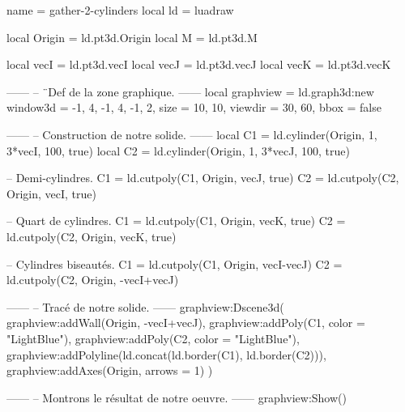 \documentclass{standalone}
\begin{document}
\begin{luadraw*}{name = gather-2-cylinders}
local ld = luadraw

local Origin = ld.pt3d.Origin
local M      = ld.pt3d.M

local vecI = ld.pt3d.vecI
local vecJ = ld.pt3d.vecJ
local vecK = ld.pt3d.vecK

------
-- ¨Def de la zone graphique.
------
local graphview = ld.graph3d:new{
  window3d = {-1, 4, -1, 4, -1, 2},
  size     = {10, 10},
  viewdir  = {30, 60},
  bbox     = false
}

------
-- Construction de notre solide.
------
local C1 = ld.cylinder(Origin, 1, 3*vecI, 100, true)
local C2 = ld.cylinder(Origin, 1, 3*vecJ, 100, true)

-- Demi-cylindres.
C1 = ld.cutpoly(C1, {Origin, vecJ}, true)
C2 = ld.cutpoly(C2, {Origin, vecI}, true)

-- Quart de cylindres.
C1 = ld.cutpoly(C1, {Origin, vecK}, true)
C2 = ld.cutpoly(C2, {Origin, vecK}, true)

-- Cylindres biseautés.
C1 = ld.cutpoly(C1, {Origin, vecI-vecJ})
C2 = ld.cutpoly(C2, {Origin, -vecI+vecJ})

------
-- Tracé de notre solide.
------
graphview:Dscene3d(
  graphview:addWall({Origin, -vecI+vecJ}),
  graphview:addPoly(C1, {color = "LightBlue"}),
  graphview:addPoly(C2, {color = "LightBlue"}),
  graphview:addPolyline(ld.concat(ld.border(C1), ld.border(C2))),
  graphview:addAxes(Origin, {arrows = 1})
)

------
-- Montrons le résultat de notre oeuvre.
------
graphview:Show()
\end{luadraw*}
\end{document}
